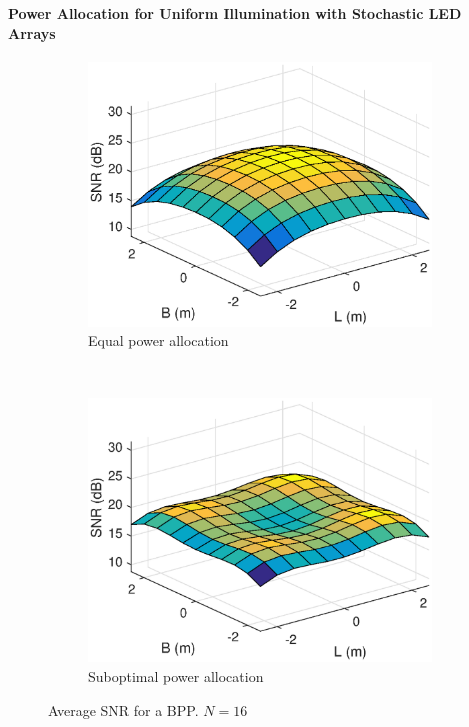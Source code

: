 \documentclass[slidestop,usepdftitle=false]{gvvslides}
\begin{document}
\begin{frame}
\frametitle{\,}
\framesubtitle{Power Allocation for Uniform Illumination with
Stochastic LED Arrays}
\begin{figure}[t!]
    \centering
    \begin{subfigure}[t]{0.5\columnwidth}
        \centering
        \includegraphics[width=\columnwidth]{randomNoPowerDist_new}
        \caption{Equal power allocation}
\label{fig3:subfig1}        
    \end{subfigure}%
    ~ 
    \begin{subfigure}[t]{0.5\columnwidth}
        \centering
        \includegraphics[width=\columnwidth]{randomPowerDist_new}
        \caption{Suboptimal power allocation}
\label{fig3:subfig2}
    \end{subfigure}
    \caption{Average SNR for a BPP. $N=16$}
    \label{fig3}
  \end{figure}  
\end{frame}
\end{document}
